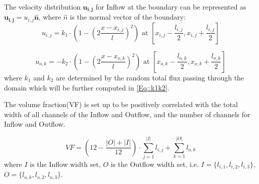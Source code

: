 \documentclass{article}
\begin{document}
The velocity distribution $\boldsymbol{u_{i,j}}$ for Inflow at the boundary can be represented as $\boldsymbol{u_{i,j}} = u_{i,j} \boldsymbol{\hat{n}}$, where $\hat{n}$ is the normal vector of the boundary:
\begin{equation}
u_{i,j} = k_1  \cdot\left(1-\left(2 \frac{x-x_{i,j}}{l}\right)^2\right) \text { at }\left[x_{i,j}-\frac{l_{i,j}}{2}, x_{i,j}+\frac{l_{i,j}}{2}\right]
\end{equation}

\begin{equation}
u_{o,k} = - k_2  \cdot\left(1-\left(2 \frac{x-x_{o,k}}{l}\right)^2\right) \text { at }\left[x_{o,k}-\frac{l_{o,k}}{2}, x_{o,k}+\frac{l_{o,k}}{2}\right]
\end{equation}
where $k_1$ and $k_2$ are determined by the random total flux passing through the domain which will be further computed in \eqref{Eq::k1k2}.

The volume fraction(VF) is set up to be positively correlated with the total width of all channels of the Inflow and Outflow, and the number of channels for Inflow and Outflow.

\begin{equation}
    VF = \left( 12 - \frac{|O| + |I|}{12} \right) \cdot \sum_{j = 1}^{|I|} l_{i,j} + \sum_{k = 1}^{|O|} l_{o,k}
\end{equation}
where $I$ is the Inflow width set, $O$ is the Outflow width set, i.e. $I = \{l_{i,1}, l_{i,2}, l_{i,3}\}$,  $O = \{l_{o,k}, l_{o,2}, l_{o,3}\}$.
\end{document}
